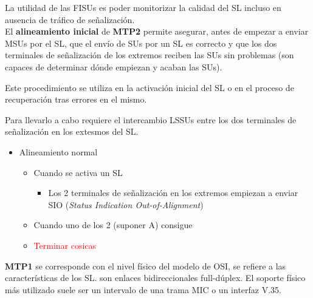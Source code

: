 \documentclass[10pt,portrait, twocolumn]{article}
\begin{document}
La utilidad de las FISUs es poder monitorizar la calidad del SL incluso en ausencia de tráfico de señalización.\\

El \textbf{alineamiento inicial} de \textbf{MTP2} permite asegurar, antes de empezar a enviar MSUs por el SL, que el envío de SUs por un SL es correcto y que los dos terminales de señalización de los extremos reciben las SUs sin problemas (son capaces de determinar dónde empiezan y acaban las SUs).

	\quad Este procedimiento se utiliza en la activación inicial del SL o en el proceso de recuperación tras errores en el mismo. 
	
	\quad Para llevarlo a cabo requiere el intercambio LSSUs entre los dos terminales de señalización en los extesmos del SL.
	
	\begin{itemize}
	\item Alineamiento normal
		\begin{itemize}
		\item Cuando se activa un SL
			\begin{itemize}
			\item Los 2 terminales de señalización en los extremos empiezan a enviar SIO (\textit{Status Indication Out-of-Alignment})
			\end{itemize}
		\item Cuando uno de los 2 (suponer A) consigue 
		\item \textcolor{red}{Terminar cosicas}
		\end{itemize}
	\end{itemize}
	
\textbf{MTP1} se corresponde con el nivel físico del modelo de OSI, se refiere a las características de los SL. son enlaces bidireccionales full-dúplex. El soporte físico más utilizado suele ser un intervalo de una trama MIC o un interfaz V.35.	
	




\end{document}
